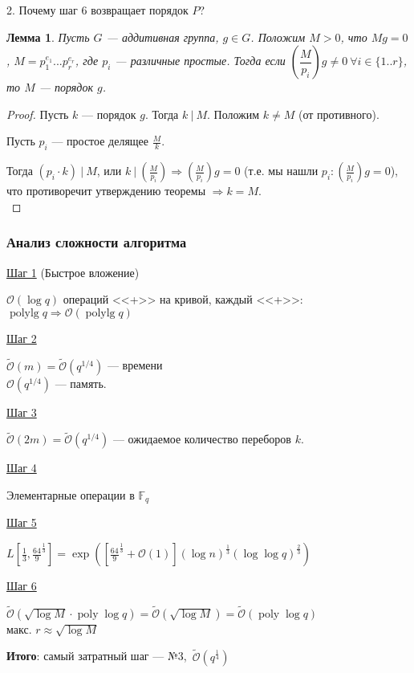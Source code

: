 \documentclass[12pt]{article}
\newcommand{\F}{{{\mathbb F}}}
\newcommand{\bigO}{\mathcal{O}}
\newcommand{\softO}{\widetilde{\bigO}}
\newtheorem{lemma}[theorem]{Лемма}
\theoremstyle{definition}
\theoremstyle{definition}
\theoremstyle{definition}
\begin{document}
2. Почему шаг 6 возвращает порядок $P$?
\begin{lemma}
    Пусть $G$ — аддитивная группа, $g \in G$. Положим $M > 0$, что $Mg = 0$, $M = p_1^{e_1}...p_r^{e_r}$, где $p_i$ — различные простые. Тогда если $\left(\dfrac{M}{p_i}\right)g \neq 0\ \forall i \in \{1..r\}$, то $M$ — порядок $g$.
\end{lemma}
\begin{proof}
    Пусть $k$ — порядок $g$. Тогда $k\ |\ M$. Положим $k \neq M$ (от противного).
    
    Пусть $p_i$ — простое делящее $\frac{M}{k}$.
    
    Тогда $(p_i \cdot k)\ |\ M$, или $k\ |\ \left(\frac{M}{p_i}\right) \Rightarrow \left(\frac{M}{p_i}\right)g = 0$ (т.е. мы нашли $p_i: \left(\frac{M}{p_i}\right)g = 0$), что противоречит утверждению теоремы $\Rightarrow k = M$.\\
\end{proof}

\subsubsection{Анализ сложности алгоритма}

\underline{Шаг 1} (Быстрое вложение)

$\bigO(\log q)$ операций <<+>> на кривой, каждый <<+>>: $\operatorname{poly lg} q \Rightarrow \bigO(\operatorname{poly lg} q)$

\underline{Шаг 2}

$\softO(m) = \softO(q^{1/4})$ — времени \\
${\bigO}(q^{1/4})$ — память.

\underline{Шаг 3}

$\softO(2m) = \softO(q^{1/4})$ — ожидаемое количество переборов $k$.

\underline{Шаг 4}

Элементарные операции в $\F_q$

\underline{Шаг 5}

$L\left[\frac{1}{3}, \frac{64}{9}^{\frac{1}{3}}\right] = \exp{\left(\left[\frac{64}{9}^{\frac{1}{3}} + \bigO(1)\right] (\log n)^{\frac{1}{3}} (\log \log q)^{\frac{2}{3}} \right)}$

\underline{Шаг 6}

$\softO(\sqrt{\log M} \cdot \operatorname{poly} \log q) = \softO(\sqrt{\log M}) = \softO(\operatorname{poly} \log q)$\\
макс. $r \approx \sqrt{\log M}$

\textbf{Итого}: самый затратный шаг — №3,\ $\softO(q^{\frac{1}{4}})$
\end{document}
